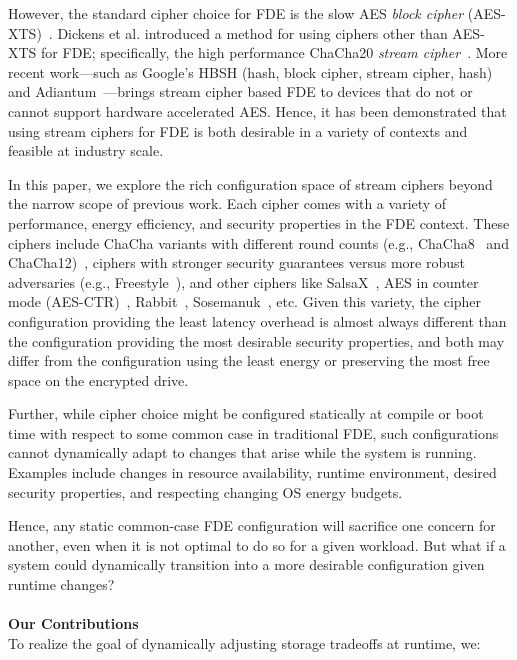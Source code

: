 However, the standard cipher choice for FDE is the slow AES \emph{block cipher}
(AES-XTS)~\cite{XTS, XTSComments, NISTXTS}. Dickens et al. introduced a method
for using ciphers other than AES-XTS for FDE; specifically, the high performance
ChaCha20 \emph{stream cipher}~\cite{StrongBox, ChaCha20}. More recent
work---such as Google's HBSH (hash, block cipher, stream cipher, hash) and
Adiantum~\cite{Adiantum}---brings stream cipher based FDE to devices that do not
or cannot support hardware accelerated AES. Hence, it has been demonstrated that
using stream ciphers for FDE is both desirable in a variety of contexts and
feasible at industry scale.

In this paper, we explore the rich configuration space of stream ciphers beyond
the narrow scope of previous work. Each cipher comes with a variety of
performance, energy efficiency, and security properties in the FDE context.
These ciphers include ChaCha variants with different round counts (e.g.,
ChaCha8~\cite{} and ChaCha12)~\cite{ChaCha20}, ciphers with stronger security
guarantees versus more robust adversaries (e.g., Freestyle~\cite{Freestyle}),
and other ciphers like SalsaX~\cite{SalsaX}, AES in counter mode
(AES-CTR)~\cite{AESCTR}, Rabbit~\cite{Rabbit}, Sosemanuk~\cite{Sosemanuk}, etc.
Given this variety, the cipher configuration providing the least latency
overhead is almost always different than the configuration providing the most
desirable security properties, and both may differ from the configuration using
the least energy or preserving the most free space on the encrypted drive.

Further, while cipher choice might be configured statically at compile or boot
time with respect to some common case in traditional FDE, such configurations
cannot dynamically adapt to changes that arise while the system is running.
Examples include changes in resource availability, runtime environment, desired
security properties, and respecting changing OS energy budgets.

Hence, any static common-case FDE configuration will sacrifice one concern for
another, even when it is not optimal to do so for a given workload. But what if
a system could dynamically transition into a more desirable configuration given
runtime changes?\\
\\
\textbf{Our Contributions}\\
To realize the goal of dynamically adjusting storage tradeoffs at runtime, we:

